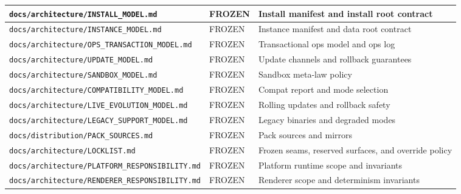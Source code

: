 \documentclass[9pt,a4paper,openany]{book}
\newcommand{\toprule}{\hline}
\newcommand{\midrule}{\hline}
\newcommand{\bottomrule}{\hline}
\begin{document}
\begin{center}
{\small\renewcommand{\arraystretch}{1.18}
\begin{tabularx}{\linewidth}{@{}>{\raggedright\arraybackslash}X >{\raggedright\arraybackslash}X >{\raggedright\arraybackslash}X@{}}
\toprule
\textbf{\texttt{docs/\allowbreak{}architecture/\allowbreak{}INSTALL\_\allowbreak{}MODEL.\allowbreak{}md}} & \textbf{FROZEN} & \textbf{Install manifest and install root contract} \\
\midrule
\texttt{docs/\allowbreak{}architecture/\allowbreak{}INSTANCE\_\allowbreak{}MODEL.\allowbreak{}md} & FROZEN & Instance manifest and data root contract \\
\texttt{docs/\allowbreak{}architecture/\allowbreak{}OPS\_\allowbreak{}TRANSACTION\_\allowbreak{}MODEL.\allowbreak{}md} & FROZEN & Transactional ops model and ops log \\
\texttt{docs/\allowbreak{}architecture/\allowbreak{}UPDATE\_\allowbreak{}MODEL.\allowbreak{}md} & FROZEN & Update channels and rollback guarantees \\
\texttt{docs/\allowbreak{}architecture/\allowbreak{}SANDBOX\_\allowbreak{}MODEL.\allowbreak{}md} & FROZEN & Sandbox meta-\allowbreak{}law policy \\
\texttt{docs/\allowbreak{}architecture/\allowbreak{}COMPATIBILITY\_\allowbreak{}MODEL.\allowbreak{}md} & FROZEN & Compat report and mode selection \\
\texttt{docs/\allowbreak{}architecture/\allowbreak{}LIVE\_\allowbreak{}EVOLUTION\_\allowbreak{}MODEL.\allowbreak{}md} & FROZEN & Rolling updates and rollback safety \\
\texttt{docs/\allowbreak{}architecture/\allowbreak{}LEGACY\_\allowbreak{}SUPPORT\_\allowbreak{}MODEL.\allowbreak{}md} & FROZEN & Legacy binaries and degraded modes \\
\texttt{docs/\allowbreak{}distribution/\allowbreak{}PACK\_\allowbreak{}SOURCES.\allowbreak{}md} & FROZEN & Pack sources and mirrors \\
\texttt{docs/\allowbreak{}architecture/\allowbreak{}LOCKLIST.\allowbreak{}md} & FROZEN & Frozen seams, reserved surfaces, and override policy \\
\texttt{docs/\allowbreak{}architecture/\allowbreak{}PLATFORM\_\allowbreak{}RESPONSIBILITY.\allowbreak{}md} & FROZEN & Platform runtime scope and invariants \\
\texttt{docs/\allowbreak{}architecture/\allowbreak{}RENDERER\_\allowbreak{}RESPONSIBILITY.\allowbreak{}md} & FROZEN & Renderer scope and determinism invariants \\
\bottomrule
\end{tabularx}
}
\end{center}
\end{document}
